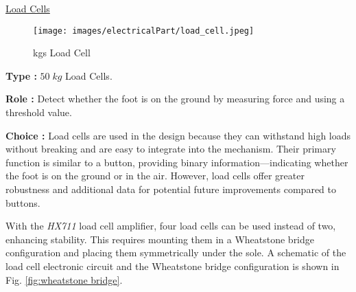 \documentclass[lettersize,journal]{IEEEtran}
\begin{document}



\bigskip

\noindent \underline{Load Cells}

\begin{figure}[!h]
    \centering
    \texttt{[image: images/electricalPart/load\_cell.jpeg]}
    \caption{ kgs Load Cell}
    \label{fig:IMU}
\end{figure}




\noindent \textbf{Type :} $50\;kg$ Load Cells.

\medskip \noindent \textbf{Role :} Detect whether the foot is on the ground by measuring force and using a threshold value.

\medskip \noindent \textbf{Choice :} 
Load cells are used in the design because they can withstand high loads without breaking and are easy to integrate into the mechanism. Their primary function is similar to a button, providing binary information—indicating whether the foot is on the ground or in the air. However, load cells offer greater robustness and additional data for potential future improvements compared to buttons.

With the \textit{HX711} load cell amplifier, four load cells can be used instead of two, enhancing stability. This requires mounting them in a Wheatstone bridge configuration and placing them symmetrically under the sole. A schematic of the load cell electronic circuit and the Wheatstone bridge configuration is shown in Fig. \ref{fig:wheatstone bridge}.

\end{document}
